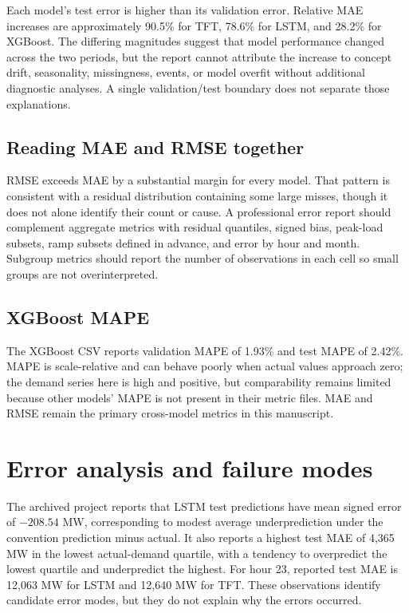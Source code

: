 \documentclass[12pt,a4paper]{article}
\begin{document}
Each model's test error is higher than its validation error. Relative MAE increases are approximately 90.5\% for TFT, 78.6\% for LSTM, and 28.2\% for XGBoost. The differing magnitudes suggest that model performance changed across the two periods, but the report cannot attribute the increase to concept drift, seasonality, missingness, events, or model overfit without additional diagnostic analyses. A single validation/test boundary does not separate those explanations.

\subsection{Reading MAE and RMSE together}
RMSE exceeds MAE by a substantial margin for every model. That pattern is consistent with a residual distribution containing some large misses, though it does not alone identify their count or cause. A professional error report should complement aggregate metrics with residual quantiles, signed bias, peak-load subsets, ramp subsets defined in advance, and error by hour and month. Subgroup metrics should report the number of observations in each cell so small groups are not overinterpreted.

\subsection{XGBoost MAPE}
The XGBoost CSV reports validation MAPE of 1.93\% and test MAPE of 2.42\%. MAPE is scale-relative and can behave poorly when actual values approach zero; the demand series here is high and positive, but comparability remains limited because other models' MAPE is not present in their metric files. MAE and RMSE remain the primary cross-model metrics in this manuscript.

\newpage
\section{Error analysis and failure modes}
The archived project reports that LSTM test predictions have mean signed error of $-208.54$ MW, corresponding to modest average underprediction under the convention prediction minus actual. It also reports a highest test MAE of 4,365 MW in the lowest actual-demand quartile, with a tendency to overpredict the lowest quartile and underpredict the highest. For hour 23, reported test MAE is 12,063 MW for LSTM and 12,640 MW for TFT. These observations identify candidate error modes, but they do not explain why the errors occurred.
\end{document}
